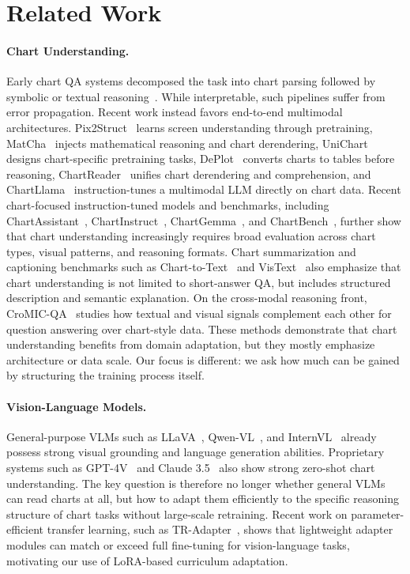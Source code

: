 \documentclass[journal]{IEEEtran}
\begin{document}
\section{Related Work}
\paragraph{Chart Understanding.}
Early chart QA systems decomposed the task into chart parsing followed by symbolic or textual reasoning~\cite{kafle2018dvqa,kahou2017figureqa}.
While interpretable, such pipelines suffer from error propagation.
Recent work instead favors end-to-end multimodal architectures.
Pix2Struct~\cite{lee2023pix2struct} learns screen understanding through pretraining, MatCha~\cite{liu2023matcha} injects mathematical reasoning and chart derendering, UniChart~\cite{masry2023unichart} designs chart-specific pretraining tasks, DePlot~\cite{liu2023deplot} converts charts to tables before reasoning, ChartReader~\cite{cheng2023chartreader} unifies chart derendering and comprehension, and ChartLlama~\cite{han2023chartllama} instruction-tunes a multimodal LLM directly on chart data.
Recent chart-focused instruction-tuned models and benchmarks, including ChartAssistant~\cite{meng2024chartassistant}, ChartInstruct~\cite{masry2024chartinstruct}, ChartGemma~\cite{masry2024chartgemma}, and ChartBench~\cite{xu2023chartbench}, further show that chart understanding increasingly requires broad evaluation across chart types, visual patterns, and reasoning formats.
Chart summarization and captioning benchmarks such as Chart-to-Text~\cite{kantharaj2022charttotext} and VisText~\cite{tang2023vistext} also emphasize that chart understanding is not limited to short-answer QA, but includes structured description and semantic explanation.
On the cross-modal reasoning front, CroMIC-QA~\cite{qian2024cromic} studies how textual and visual signals complement each other for question answering over chart-style data.
These methods demonstrate that chart understanding benefits from domain adaptation, but they mostly emphasize architecture or data scale.
Our focus is different: we ask how much can be gained by structuring the training process itself.

\paragraph{Vision-Language Models.}
General-purpose VLMs such as LLaVA~\cite{liu2024visual}, Qwen-VL~\cite{bai2023qwen}, and InternVL~\cite{chen2024internvl} already possess strong visual grounding and language generation abilities.
Proprietary systems such as GPT-4V~\cite{openai2023gpt4v} and Claude 3.5~\cite{anthropic2024claude} also show strong zero-shot chart understanding.
The key question is therefore no longer whether general VLMs can read charts at all, but how to adapt them efficiently to the specific reasoning structure of chart tasks without large-scale retraining.
Recent work on parameter-efficient transfer learning, such as TR-Adapter~\cite{wang2025tradapter}, shows that lightweight adapter modules can match or exceed full fine-tuning for vision-language tasks, motivating our use of LoRA-based curriculum adaptation.
\end{document}
